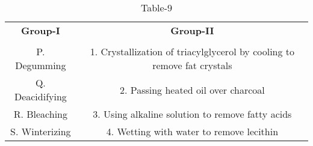 \begin{table}[htbp]
  \centering
  \caption{Table-9}
  \label{table9}
  \begin{tabular}{cc}
  \textbf{Group-I} & \textbf{Group-II} \\ \\
    P. Degumming & 1. Crystallization of triacylglycerol by cooling to remove fat crystals \\
    Q. Deacidifying & 2. Passing heated oil over charcoal \\
    R. Bleaching & 3. Using alkaline solution to remove fatty acids \\
    S. Winterizing & 4. Wetting with water to remove lecithin \\
  \end{tabular}
\end{table}